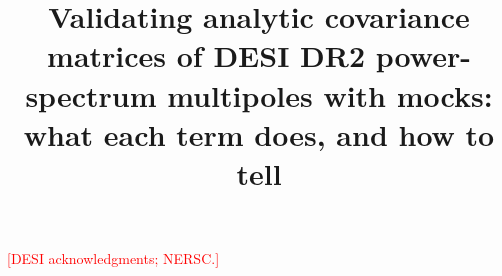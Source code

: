 \documentclass[a4paper,11pt]{article}
\title{Validating analytic covariance matrices of DESI DR2 power-spectrum multipoles with mocks: what each term does, and how to tell}
\author[a]{\todo{author list}}
\affiliation[a]{\todo{affiliations}}
\newcommand{\todo}[1]{\textcolor{red}{[#1]}}
\begin{document}
\maketitle
\flushbottom









\acknowledgments
\todo{DESI acknowledgments; NERSC.}

\appendix



\end{document}
